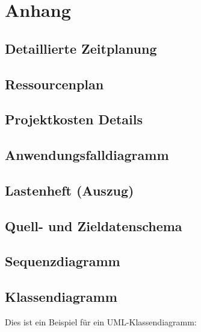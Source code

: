 \documentclass[12pt,toc=sectionentrywithoutdots, headheight=44pt, headings=optiontoheadandtoc]{scrartcl}
\begin{document}
\section{Anhang}
\subsection{Detaillierte Zeitplanung}
\blindtext

\subsection{Ressourcenplan}
\blindtext\blindtext

\subsection{Projektkosten Details}
\blindtext\blindtext

\subsection{Anwendungsfalldiagramm}
\blindtext\blindtext

\subsection{Lastenheft (Auszug)}
\blindtext\blindtext

\subsection{Quell- und Zieldatenschema}
\blindtext\blindtext

\subsection{Sequenzdiagramm}
\blindtext\blindtext

\clearpage
\subsection{Klassendiagramm}

Dies ist ein Beispiel für ein UML-Klassendiagramm:\\
\end{document}
